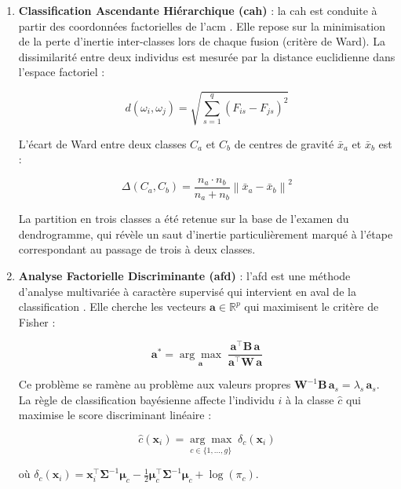 \documentclass[12pt, a4paper, oneside]{report}
\begin{document}
\begin{enumerate}
  \item \textbf{Classification Ascendante Hiérarchique (\gls{cah})} : la \gls{cah} est conduite à partir des coordonnées factorielles de l'\gls{acm} \cite{ward1963}. Elle repose sur la minimisation de la perte d'inertie inter-classes lors de chaque fusion (critère de Ward). La dissimilarité entre deux individus est mesurée par la distance euclidienne dans l'espace factoriel :

  \begin{equation}
    d(\omega_i, \omega_j) = \sqrt{\sum_{s=1}^{q} \left(F_{is} - F_{js}\right)^2}
    \label{eq:distance_euclidienne}
  \end{equation}

  L'écart de Ward entre deux classes $C_a$ et $C_b$ de centres de gravité $\bar{x}_a$ et $\bar{x}_b$ est :

  \begin{equation}
    \Delta(C_a, C_b) = \frac{n_a \cdot n_b}{n_a + n_b} \left\| \bar{x}_a - \bar{x}_b \right\|^2
    \label{eq:ward}
  \end{equation}

  La partition en trois classes a été retenue sur la base de l'examen du dendrogramme, qui révèle un saut d'inertie particulièrement marqué à l'étape correspondant au passage de trois à deux classes.

  \item \textbf{Analyse Factorielle Discriminante (\gls{afd})} : l'\gls{afd} est une méthode d'analyse multivariée à caractère supervisé qui intervient en aval de la classification \cite{fisher1936}. Elle cherche les vecteurs $\mathbf{a} \in \mathbb{R}^p$ qui maximisent le critère de Fisher :

  \begin{equation}
    \mathbf{a}^* = \underset{\mathbf{a}}{\arg\max}\;
    \frac{\mathbf{a}^{\top}\mathbf{B}\,\mathbf{a}}{\mathbf{a}^{\top}\mathbf{W}\,\mathbf{a}}
    \label{eq:fisher}
  \end{equation}

  Ce problème se ramène au problème aux valeurs propres $\mathbf{W}^{-1}\mathbf{B}\,\mathbf{a}_s = \lambda_s\,\mathbf{a}_s$. La règle de classification bayésienne affecte l'individu $i$ à la classe $\hat{c}$ qui maximise le score discriminant linéaire :

  \begin{equation}
    \boxed{\hat{c}(\mathbf{x}_i) = \underset{c \in \{1,\ldots,g\}}{\arg\max}\; \delta_c(\mathbf{x}_i)}
    \label{eq:regle_classif}
  \end{equation}

  où $\delta_c(\mathbf{x}_i) = \mathbf{x}_i^{\top}\boldsymbol{\Sigma}^{-1}\boldsymbol{\mu}_c - \frac{1}{2}\boldsymbol{\mu}_c^{\top}\boldsymbol{\Sigma}^{-1}\boldsymbol{\mu}_c + \log(\pi_c)$.
\end{enumerate}
\end{document}
